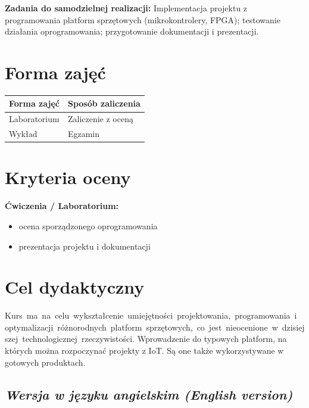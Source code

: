 \documentclass[12pt, a4paper]{article}
\newcommand{\thdrule}{\noalign{\global\setlength{\extrarowheight}{0pt}}}
\newcommand{\thdend}{\noalign{\global\setlength{\extrarowheight}{3pt}}}
\begin{document}
\vspace{4pt}
\noindent\textbf{Zadania do samodzielnej realizacji:} Implementacja projektu z programowania platform sprzętowych (mikrokontrolery, FPGA); testowanie działania oprogramowania; przygotowanie dokumentacji i prezentacji.

\section{Forma zajęć}

\begin{center}
{\scriptsize
\begin{tabular}{m{5cm}m{8cm}}
\thdrule\toprule
\rowcolor{pjatkRed} {\color{white}\textbf{Forma zajęć}} & {\color{white}\textbf{Sposób zaliczenia}} \\
\midrule\thdend
  \rowcolor{tableRowLight} Laboratorium & Zaliczenie z oceną \\
  \rowcolor{tableRowAlt} Wykład & Egzamin \\
\bottomrule
\end{tabular}}
\end{center}

\section{Kryteria oceny}

\textbf{Ćwiczenia / Laboratorium:}
\begin{itemize}
  \item ocena sporządzonego oprogramowania
  \item prezentacja projektu i dokumentacji
\end{itemize}


\section{Cel dydaktyczny}

Kurs ma na celu wykształcenie umiejętności projektowania, programowania i optymalizacji różnorodnych platform sprzętowych, co jest nieocenione w dzisiejszej technologicznej rzeczywistości. Wprowadzenie do typowych platform, na których można rozpoczynać projekty z IoT. Są one także wykorzystywane w gotowych produktach.

\subsection*{\textit{Wersja w języku angielskim (English version)}}
\end{document}
